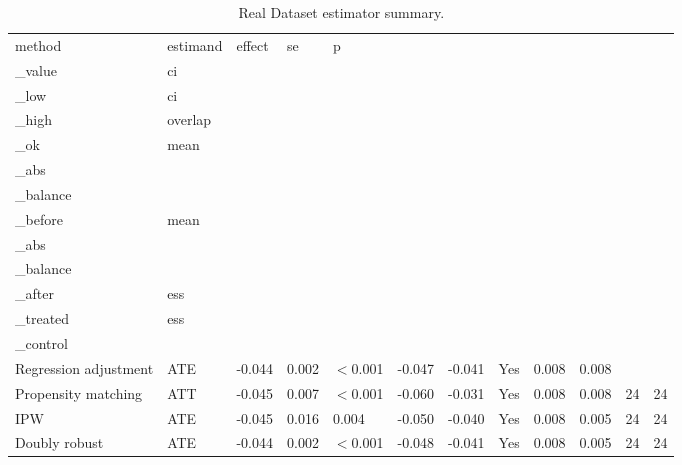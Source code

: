 \begin{table}[t!]
\centering
\small
\caption{Real Dataset estimator summary.}
\label{tab:real_dataset-estimators}
\setlength{\tabcolsep}{4.5pt}
\begin{tabular}{llllllllllll}
\hline
method & estimand & effect & se & p\\_value & ci\\_low & ci\\_high & overlap\\_ok & mean\\_abs\\_balance\\_before & mean\\_abs\\_balance\\_after & ess\\_treated & ess\\_control \\
\hline
Regression adjustment & ATE & -0.044 & 0.002 & $<$0.001 & -0.047 & -0.041 & Yes & 0.008 & 0.008 &  &  \\
Propensity matching & ATT & -0.045 & 0.007 & $<$0.001 & -0.060 & -0.031 & Yes & 0.008 & 0.008 & 24 & 24 \\
IPW & ATE & -0.045 & 0.016 & 0.004 & -0.050 & -0.040 & Yes & 0.008 & 0.005 & 24 & 24 \\
Doubly robust & ATE & -0.044 & 0.002 & $<$0.001 & -0.048 & -0.041 & Yes & 0.008 & 0.005 & 24 & 24 \\
\hline
\end{tabular}
\end{table}
